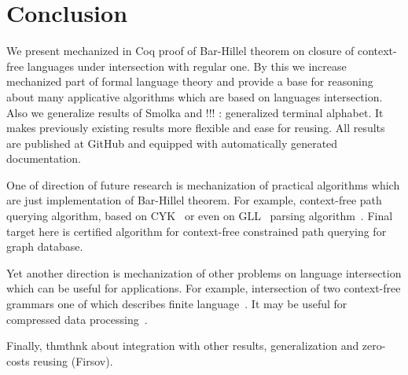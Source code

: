 \section{Conclusion}

We present mechanized in Coq proof of Bar-Hillel theorem on closure of context-free languages under intersection with regular one.
By this we increase mechanized part of formal language theory and provide a base for reasoning about many applicative algorithms which are based on languages intersection.
Also we generalize results of Smolka and !!! : generalized terminal alphabet. 
It makes previously existing results more flexible and ease for reusing.
All results are published at GitHub and equipped with automatically generated documentation.

One of direction of future research is mechanization of practical algorithms which are just implementation of Bar-Hillel theorem.
For example, context-free path querying algorithm, based on CYK~\cite{Hellings,RDF} or even on GLL~\cite{scott2010gll} parsing algorithm~\cite{grigorev2016context}.
Final target here is certified algorithm for context-free constrained path querying for graph database.

Yet another direction is mechanization of other problems on language intersection which can be useful for applications.
For example, intersection of two context-free grammars one of which describes finite language~\cite{nederhof2002parsing, nederhof2004language}.
It may be useful for compressed data processing~\cite{!!!}.

Finally, thmthnk about integration with other results, generalization and zero-costs reusing (Firsov).

